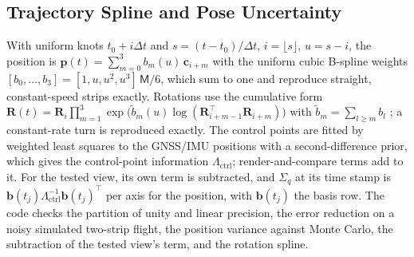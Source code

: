 \subsection{Trajectory Spline and Pose Uncertainty}
With uniform knots $t_0+i\Delta t$ and $s=(t-t_0)/\Delta t$, $i=\lfloor s\rfloor$, $u=s-i$, the position is
$\mathbf{p}(t)=\sum_{m=0}^{3}b_m(u)\,\mathbf{c}_{i+m}$ with the uniform cubic B-spline weights
$[b_0,\dots,b_3]=[1,u,u^{2},u^{3}]\,\mathsf{M}/6$, which sum to one and reproduce straight, constant-speed
strips exactly. Rotations use the cumulative form
$\mathbf{R}(t)=\mathbf{R}_i\prod_{m=1}^{3}\exp\bigl(\tilde b_m(u)\log(\mathbf{R}_{i+m-1}^{\top}\mathbf{R}_{i+m})\bigr)$ with
$\tilde b_m=\sum_{l\ge m}b_l$ \cite{traj_sommer_bspline}; a constant-rate turn is reproduced exactly. The
control points are fitted by weighted least squares to the GNSS/IMU positions with a second-difference
prior, which gives the control-point information $\Lambda_{\mathrm{ctrl}}$; render-and-compare terms add to
it. For the tested view, its own term is subtracted, and $\Sigma_q$ at its time stamp is
$\mathbf{b}(t_j)\Lambda_{\mathrm{ctrl}}^{-1}\mathbf{b}(t_j)^{\top}$ per axis for the position, with $\mathbf{b}(t_j)$ the basis row. The
code checks the partition of unity and linear precision, the error reduction on a noisy simulated
two-strip flight, the position variance against Monte Carlo, the subtraction of the tested view's term,
and the rotation spline.
